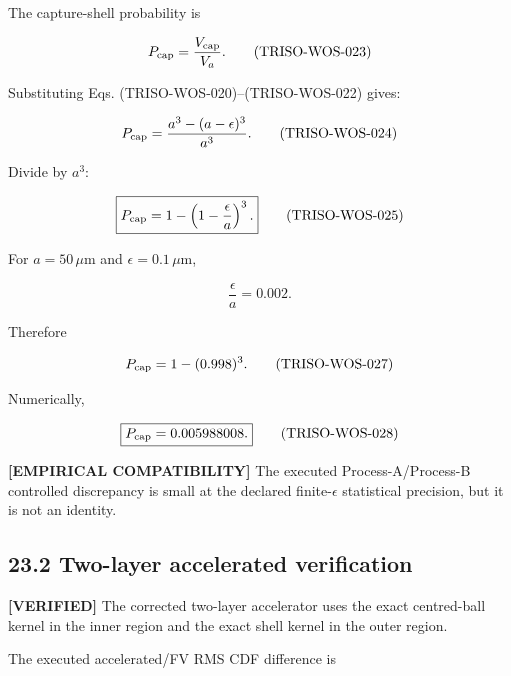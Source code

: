 \documentclass[11pt,a4paper]{article}
\begin{document}
The capture-shell probability is

\begin{equation}
P_{\rm cap}
=
\frac{V_{\rm cap}}{V_a}.
\tag{TRISO-WOS-023}
\label{eq:triso-wos-023}
\end{equation}

Substituting Eqs. (TRISO-WOS-020)–(TRISO-WOS-022) gives:

\begin{equation}
P_{\rm cap}
=
\frac{a^3-(a-\epsilon)^3}{a^3}.
\tag{TRISO-WOS-024}
\label{eq:triso-wos-024}
\end{equation}

Divide by $a^3$:

\begin{equation}
\boxed{
P_{\rm cap}
=
1-\left(1-\frac{\epsilon}{a}\right)^3.
}
\tag{TRISO-WOS-025}
\label{eq:triso-wos-025}
\end{equation}

For $a=50\,\mu\mathrm m$ and $\epsilon=0.1\,\mu\mathrm m$,

\begin{equation}
\frac{\epsilon}{a}=0.002.
\tag{TRISO-WOS-026}
\label{eq:triso-wos-026}
\end{equation}

Therefore

\begin{equation}
P_{\rm cap}=1-(0.998)^3.
\tag{TRISO-WOS-027}
\label{eq:triso-wos-027}
\end{equation}

Numerically,

\begin{equation}
\boxed{P_{\rm cap}=0.005988008.}
\tag{TRISO-WOS-028}
\label{eq:triso-wos-028}
\end{equation}

\textbf{[EMPIRICAL COMPATIBILITY]} The executed Process-A/Process-B controlled discrepancy is small at the declared finite-$\epsilon$ statistical precision, but it is not an identity.

\subsection*{23.2 Two-layer accelerated verification}

\textbf{[VERIFIED]} The corrected two-layer accelerator uses the exact centred-ball kernel in the inner region and the exact shell kernel in the outer region.

The executed accelerated/FV RMS CDF difference is
\end{document}
